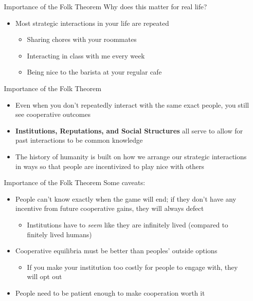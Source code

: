 \begin{frame}{Importance of the Folk Theorem}
  Why does this matter for real life? 
  \begin{itemize}
    \item Most strategic interactions in your life are repeated 
    \begin{itemize}
      \item Sharing chores with your roommates 
      \item Interacting in class with me every week
      \item Being nice to the barista at your regular cafe
    \end{itemize}
  \end{itemize}
\end{frame}

\begin{frame}{Importance of the Folk Theorem}
  \begin{itemize}
    \item Even when you don't repeatedly interact with the same exact people, you still see cooperative outcomes 
    \item \textbf{Institutions, Reputations, and Social Structures} all serve to allow for past interactions to be common knowledge
    \item The history of humanity is built on how we arrange our strategic interactions in ways so that people are incentivized to play nice with others
  \end{itemize}
\end{frame}

\begin{frame}{Importance of the Folk Theorem}
  Some caveats:
  \begin{itemize}
    \item People can't know exactly when the game will end; if they don't have any incentive from future cooperative gains, they will always defect
    \begin{itemize}
      \item Institutions have to \textit{seem} like they are infinitely lived (compared to finitely lived humans)
    \end{itemize}
    \item Cooperative equilibria must be better than peoples' outside options 
    \begin{itemize}
      \item If you make your institution too costly for people to engage with, they will opt out 
    \end{itemize}
    \item People need to be patient enough to make cooperation worth it
  \end{itemize}
\end{frame}
